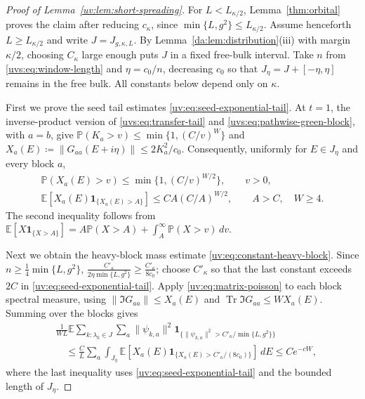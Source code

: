 \documentclass[11pt]{article}
\numberwithin{equation}{section}
\theoremstyle{remark}
\newcommand{\E}{\mathbb E}
\newcommand{\Prob}{\mathbb P}
\newcommand{\Tr}{\operatorname{Tr}}
\newcommand{\one}{\mathbf 1}
\begin{document}
\begin{proof}[Proof of Lemma~\ref{uv:lem:short-spreading}]
For $L<L_{\kappa/2}$, Lemma~\ref{thm:orbital} proves the claim after
reducing $c_\kappa$, since $\min\{L,g^2\}\le L_{\kappa/2}$.
Assume henceforth $L\ge L_{\kappa/2}$ and write $J=J_{g,\kappa,L}$.
By Lemma~\ref{da:lem:distribution}\textup{(iii)} with margin $\kappa/2$, choosing $C_\kappa$
large enough puts $J$ in a fixed free-bulk interval. Take $n$ from
\eqref{uvs:eq:window-length} and $\eta=c_0/n$, decreasing $c_0$ so that
$J_\eta=J+[-\eta,\eta]$ remains in the free bulk. All constants below
depend only on $\kappa$.

First we prove the seed tail estimates \eqref{uv:eq:seed-exponential-tail}.
At $t=1$, the inverse-product version of \eqref{uvs:eq:transfer-tail} and
\eqref{uvs:eq:pathwise-green-block}, with $a=b$, give
$\Prob(K_a>v)\le\min\{1,(C/v)^W\}$ and
$X_a(E)\coloneqq\|G_{aa}(E+i\eta)\|\le2K_a^2/c_0$.
Consequently, uniformly for $E\in J_\eta$ and every block $a$,
\begin{equation}\label{uv:eq:seed-exponential-tail}
 \begin{gathered}
 \Prob(X_a(E)>v)\le\min\{1,(C/v)^{W/2}\},\qquad v>0,\\
 \E[X_a(E)\one_{\{X_a(E)>A\}}]\le C A(C/A)^{W/2},
 \qquad A>C,\quad W\ge4.
 \end{gathered}
\end{equation}
The second inequality follows from
$\E[X\one_{\{X>A\}}]=A\Prob(X>A)+\int_A^\infty\Prob(X>v)\,dv$.

Next we obtain the heavy-block mass estimate
\eqref{uv:eq:constant-heavy-block}.
Since $n\ge\frac14\min\{L,g^2\}$,
$\frac{C'_\kappa}{2\eta\min\{L,g^2\}}\ge\frac{C'_\kappa}{8c_0}$;
choose $C'_\kappa$ so that the last constant exceeds $2C$ in
\eqref{uv:eq:seed-exponential-tail}.
Apply \eqref{uv:eq:matrix-poisson} to each block spectral measure,
using $\|\Im G_{aa}\|\le X_a(E)$ and $\Tr\Im G_{aa}\le WX_a(E)$.
Summing over the blocks gives
\begin{equation}\label{uv:eq:constant-heavy-block}
 \begin{aligned}
 &\frac1{WL}\E\sum_{k:\lambda_k\in J}\sum_a
 \|\psi_{k,a}\|^2\one_{\{\|\psi_{k,a}\|^2>C'_\kappa/\min\{L,g^2\}\}}\\
 &\quad\le\frac C L\sum_a\int_{J_\eta}
 \E[X_a(E)\one_{\{X_a(E)>C'_\kappa/(8c_0)\}}]\,dE
 \le Ce^{-cW},
 \end{aligned}
\end{equation}
where the last inequality uses \eqref{uv:eq:seed-exponential-tail}
and the bounded length of $J_\eta$.


\end{proof}
\end{document}
